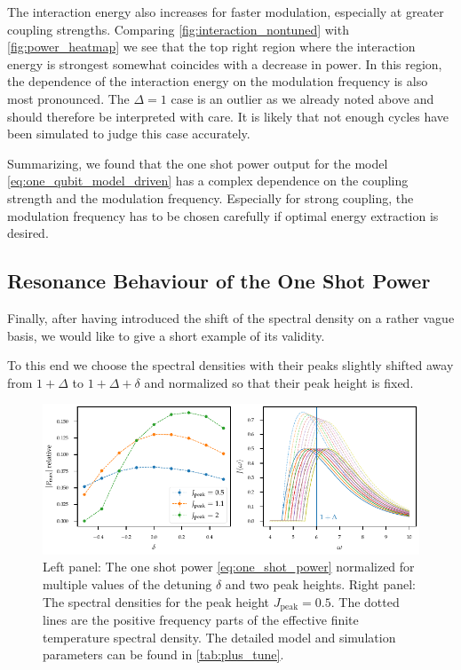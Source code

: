 The interaction energy also increases for faster modulation,
especially at greater coupling strengths. Comparing
\cref{fig:interaction_nontuned} with \cref{fig:power_heatmap} we see
that the top right region where the interaction energy is strongest
somewhat coincides with a decrease in power. In this region, the
dependence of the interaction energy on the modulation frequency is
also most pronounced.  The \(Δ=1\) case is an outlier as we already
noted above and should therefore be interpreted with care. It is
likely that not enough cycles have been simulated to judge this case
accurately.

Summarizing, we found that the one shot power output for the model
\cref{eq:one_qubit_model_driven} has a complex dependence on the
coupling strength and the modulation frequency. Especially for strong
coupling, the modulation frequency has to be chosen carefully if
optimal energy extraction is desired.

\subsection{Resonance Behaviour of the One Shot Power}
\label{sec:modcoup_reso}
Finally, after having introduced the shift of the spectral density on
a rather vague basis, we would like to give a short example of its
validity.

To this end we choose the spectral densities with their peaks
slightly shifted away from \(1+Δ\) to \(1+Δ+δ\) and normalized so that
their peak height is fixed.
\begin{figure}[htb]
  \centering
  \includegraphics{figs/one_bath_mod/modulation_tuning}
  \caption{\label{fig:modulation_tuning} Left panel: The one shot
    power \cref{eq:one_shot_power} normalized for multiple values of
    the detuning \(δ\) and two peak heights. Right panel: The spectral
    densities for the peak height \(J_{\mathrm{peak}} = 0.5\). The
    dotted lines are the positive frequency parts of the effective
    finite temperature spectral density. The detailed model and
    simulation parameters can be found in \cref{tab:plus_tune}.}
\end{figure}

